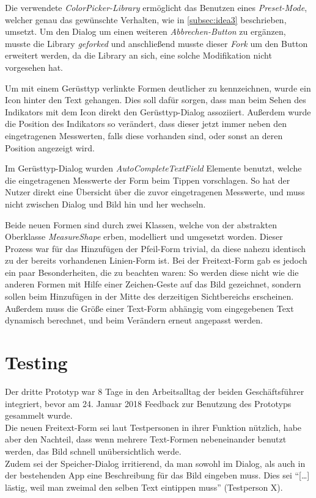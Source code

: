 Die verwendete \emph{ColorPicker-Library} ermöglicht das Benutzen eines \emph{Preset-Mode}, welcher genau das gewünschte Verhalten, wie in \autoref{subsec:idea3} beschrieben, umsetzt.
Um den Dialog um einen weiteren \emph{Abbrechen-Button} zu ergänzen, musste die Library \emph{geforked} und anschließend musste dieser \emph{Fork} um den Button erweitert werden, da die Library an sich, eine solche Modifikation nicht vorgesehen hat. 

Um mit einem Gerüsttyp verlinkte Formen deutlicher zu kennzeichnen, wurde ein Icon  hinter den Text gehangen.
Dies soll dafür sorgen, dass man beim Sehen des Indikators mit dem Icon direkt den Gerüsttyp-Dialog assoziiert.
Außerdem wurde die Position des Indikators so verändert, dass dieser jetzt immer neben den eingetragenen Messwerten, falls diese vorhanden sind, oder sonst an deren Position angezeigt wird. \\

Im Gerüsttyp-Dialog wurden \emph{AutoCompleteTextField} Elemente benutzt, welche die eingetragenen Messwerte der Form beim Tippen vorschlagen.
So hat der Nutzer direkt eine Übersicht über die zuvor eingetragenen Messwerte, und muss nicht zwischen Dialog und Bild hin und her wechseln. \\

Beide neuen Formen sind durch zwei Klassen, welche von der abstrakten Oberklasse \emph{MeasureShape} erben, modelliert und umgesetzt worden.
Dieser Prozess war für das Hinzufügen der Pfeil-Form trivial, da diese nahezu identisch zu der bereits vorhandenen Linien-Form ist.
Bei der Freitext-Form gab es jedoch ein paar Besonderheiten, die zu beachten waren:
So werden diese nicht wie die anderen Formen mit Hilfe einer Zeichen-Geste auf das Bild gezeichnet, sondern sollen beim Hinzufügen in der Mitte des derzeitigen Sichtbereichs erscheinen.
Außerdem muss die Größe einer Text-Form abhängig vom eingegebenen Text dynamisch berechnet, und beim Verändern erneut angepasst werden. \\

\section{Testing}\label{sec:test3}
Der dritte Prototyp war 8 Tage in den Arbeitsalltag der beiden Geschäftsführer integriert, bevor am 24. Januar 2018 Feedback zur Benutzung des Prototyps gesammelt wurde. \\

Die neuen Freitext-Form sei laut Testpersonen in ihrer Funktion nützlich, habe aber den Nachteil, dass wenn mehrere Text-Formen nebeneinander benutzt werden, das Bild schnell unübersichtlich werde. \\

Zudem sei der Speicher-Dialog irritierend, da man sowohl im Dialog, als auch in der bestehenden App eine Beschreibung für das Bild eingeben muss.
Dies sei ``[\dots] lästig, weil man zweimal den selben Text eintippen muss'' (Testperson X).


